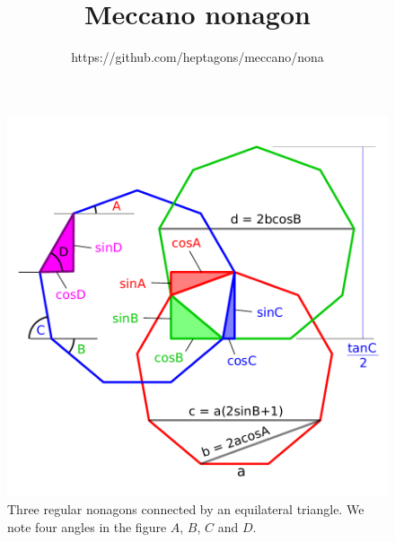 \documentclass[11pt]{article}
\title{\textbf{Meccano nonagon}}
\author{https://github.com/heptagons/meccano/nona}
\date{}
\begin{document}
\maketitle

\begin{figure}[h]
\centering
\includegraphics[scale=0.7]{figs/3nonagons}
\caption{Three regular nonagons connected by an equilateral triangle.
We note four angles in the figure $A$, $B$, $C$ and $D$.}
\label{fig:nonagons}
\end{figure}
\end{document}
